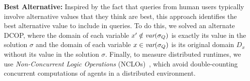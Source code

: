 \documentclass[twoside,11pt]{article}
\begin{document}
\item {\bf Best Alternative:} Inspired by the fact that queries from human users typically involve alternative values that they think are best, this approach identifies the best alternative value to include in queries. To do this, we solved an alternate DCOP, where the domain of each variable $x' \notin {\textit{var}(\sigma_Q)}$ is exactly its value in the solution $\sigma$ and the domain of each variable $x \in {\textit{var}(\sigma_Q)}$ is its original domain $D_x$ without its value in the solution $\sigma$. 
\squishend
Finally, to measure distributed runtimes, we use \emph{Non-Concurrent Logic Operations} (NCLOs)~\cite{ZivanM06b,NetzerGM12}, which avoid double-counting concurrent computations of agents in a distributed environment. 




\end{document}
